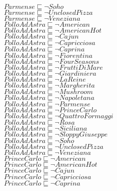 \documentclass[a4paper,10pt]{article}
\begin{document}
 $Parmense \sqsubseteq  \lnot Soho$\\ 
 $Parmense \sqsubseteq  \lnot UnclosedPizza$\\ 
 $Parmense \sqsubseteq  \lnot Veneziana$\\ 
 $PolloAdAstra \sqsubseteq  \lnot American$\\ 
 $PolloAdAstra \sqsubseteq  \lnot AmericanHot$\\ 
 $PolloAdAstra \sqsubseteq  \lnot Cajun$\\ 
 $PolloAdAstra \sqsubseteq  \lnot Capricciosa$\\ 
 $PolloAdAstra \sqsubseteq  \lnot Caprina$\\ 
 $PolloAdAstra \sqsubseteq  \lnot Fiorentina$\\ 
 $PolloAdAstra \sqsubseteq  \lnot FourSeasons$\\ 
 $PolloAdAstra \sqsubseteq  \lnot FruttiDiMare$\\ 
 $PolloAdAstra \sqsubseteq  \lnot Giardiniera$\\ 
 $PolloAdAstra \sqsubseteq  \lnot LaReine$\\ 
 $PolloAdAstra \sqsubseteq  \lnot Margherita$\\ 
 $PolloAdAstra \sqsubseteq  \lnot Mushroom$\\ 
 $PolloAdAstra \sqsubseteq  \lnot Napoletana$\\ 
 $PolloAdAstra \sqsubseteq  \lnot Parmense$\\ 
 $PolloAdAstra \sqsubseteq  \lnot PrinceCarlo$\\ 
 $PolloAdAstra \sqsubseteq  \lnot QuattroFormaggi$\\ 
 $PolloAdAstra \sqsubseteq  \lnot Rosa$\\ 
 $PolloAdAstra \sqsubseteq  \lnot Siciliana$\\ 
 $PolloAdAstra \sqsubseteq  \lnot SloppyGiuseppe$\\ 
 $PolloAdAstra \sqsubseteq  \lnot Soho$\\ 
 $PolloAdAstra \sqsubseteq  \lnot UnclosedPizza$\\ 
 $PolloAdAstra \sqsubseteq  \lnot Veneziana$\\ 
 $PrinceCarlo \sqsubseteq  \lnot American$\\ 
 $PrinceCarlo \sqsubseteq  \lnot AmericanHot$\\ 
 $PrinceCarlo \sqsubseteq  \lnot Cajun$\\ 
 $PrinceCarlo \sqsubseteq  \lnot Capricciosa$\\ 
 $PrinceCarlo \sqsubseteq  \lnot Caprina$\\ 
\end{document}
